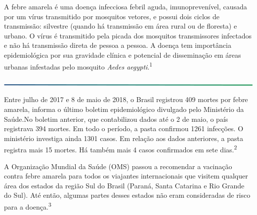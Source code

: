 \documentclass{article}
\begin{document}
{\large %

    
	A febre amarela é uma doença infecciosa febril aguda, imunoprevenível, causada por um vírus transmitido por mosquitos vetores, e possui dois ciclos de transmissão: silvestre (quando há transmissão em área rural ou de floresta) e urbano. O vírus é transmitido pela picada dos mosquitos transmissores infectados e não há transmissão direta de pessoa a pessoa. A doença tem importância epidemiológica por sua gravidade clínica e potencial de disseminação em áreas urbanas infestadas pelo mosquito \textit{Aedes aegypti}.\textsuperscript{1}

\justifying

\includegraphics[width=\linewidth]{divisoria_horizontal.png} %

\justifying

 
	Entre julho de 2017 e 8 de maio de 2018, o Brasil registrou 409 mortes por febre amarela, informa o último boletim epidemiológico divulgado pelo Ministério da Saúde.No boletim anterior, que contabilizou dados até o 2 de maio, o país registrava 394 mortes. Em todo o período, a pasta confirmou 1261 infecções. O ministério investiga ainda 1301 casos. Em relação aos dados anteriores, a pasta registra mais 15 mortes. Há também mais 4 casos confirmados em sete dias.\textsuperscript{2}

	A Organização Mundial da Saúde (OMS) passou a recomendar a vacinação contra febre amarela para todos os viajantes internacionais que visitem qualquer área dos estados da região Sul do Brasil (Paraná, Santa Catarina e Rio Grande do Sul). Até então, algumas partes desses estados não eram consideradas de risco para a doença.\textsuperscript{3}

} %
\end{document}
